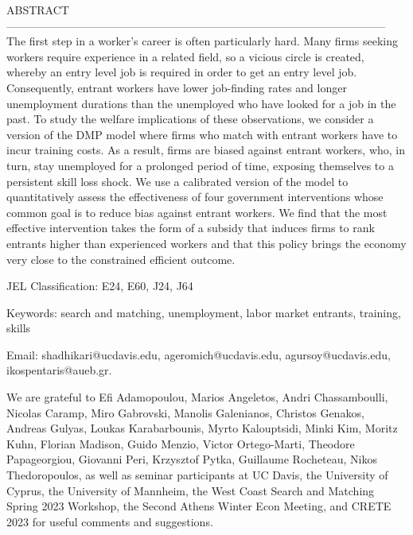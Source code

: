 \documentclass[12pt]{article} %
\theoremstyle{definition}
\begin{document}
\noindent ABSTRACT------------------------------------------------------------------------------------------------------
\noindent The first step in a worker's career is often particularly hard. Many firms seeking workers require experience in a related field, so a vicious circle is created, whereby an entry level job is required in order to get an entry level job. Consequently, entrant workers have lower job-finding rates and longer unemployment durations than the unemployed who have looked for a job in the past. To study the welfare implications of these observations, we consider a version of the DMP model where firms who match with entrant workers have to incur training costs. As a result, firms are biased against entrant workers, who, in turn, stay unemployed for a prolonged period of time, exposing themselves to a persistent skill loss shock. 
We use a calibrated version of the model to quantitatively assess the effectiveness of four government interventions whose common goal is to reduce bias against entrant workers. 
We find that the most effective intervention takes the form of a subsidy that induces firms to rank entrants higher than experienced workers and that this policy brings the economy very close to the constrained efficient outcome.


\vspace{0.4cm}


\noindent JEL Classification: E24, E60, J24, J64

\noindent Keywords: search and matching, unemployment, labor market entrants, training, skills


\vspace{0.6cm}

\noindent \footnotesize Email: shadhikari@ucdavis.edu, ageromich@ucdavis.edu, agursoy@ucdavis.edu, ikospentaris@aueb.gr.


\thispagestyle{empty}

\vspace{0.6cm}


\noindent We are grateful to Efi Adamopoulou, Marios Angeletos, Andri Chassamboulli, Nicolas Caramp, Miro Gabrovski, Manolis Galenianos, Christos Genakos, Andreas Gulyas, Loukas Karabarbounis, Myrto Kalouptsidi, Minki Kim, Moritz Kuhn, Florian Madison, Guido Menzio, Victor Ortego-Marti, Theodore Papageorgiou, Giovanni Peri, Krzysztof Pytka, Guillaume Rocheteau, Nikos Thedoropoulos, as well as seminar participants at UC Davis, the University of Cyprus, the University of Mannheim, the West Coast Search and Matching Spring 2023 Workshop, the Second Athens Winter Econ Meeting, and CRETE 2023 for useful comments and suggestions.
\end{document}
